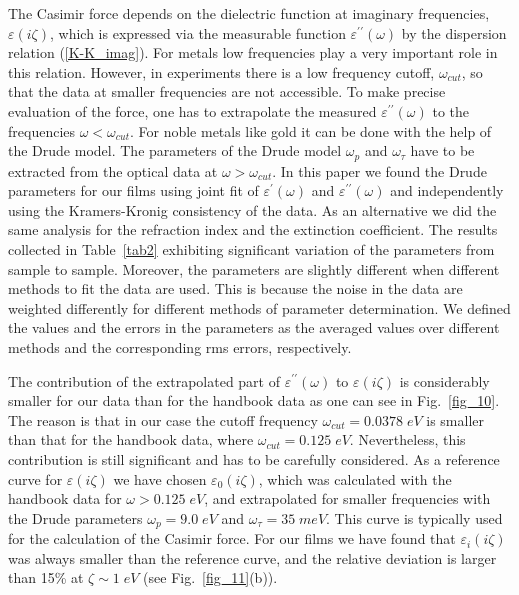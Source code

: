 \documentclass[prb]{revtex4}%
\begin{document}
The Casimir force depends on the dielectric function at imaginary
frequencies, $\varepsilon(i\zeta)$, which is expressed via the
measurable function $\varepsilon^{\prime\prime}(\omega)$ by the
dispersion relation (\ref{K-K_imag}). For metals low frequencies
play a very important role in this relation. However, in experiments
there is a low frequency cutoff, $\omega_{cut}$, so that the data at
smaller frequencies are not accessible. To make precise evaluation
of the force, one has to extrapolate the measured
$\varepsilon^{\prime\prime}(\omega)$ to the frequencies
$\omega<\omega_{cut}$. For noble metals like gold it can be done
with the help of the Drude model. The parameters of the Drude model
$\omega_p$ and $\omega_{\tau}$ have to be extracted from the optical
data at $\omega>\omega_{cut}$. In this paper we found the Drude
parameters for our films using joint fit of
$\varepsilon^{\prime}(\omega)$ and
$\varepsilon^{\prime\prime}(\omega)$ and independently using the
Kramers-Kronig consistency of the data. As an alternative we did the
same analysis for the refraction index and the extinction
coefficient. The results collected in Table~\ref{tab2} exhibiting
significant variation of the parameters from sample to sample.
Moreover, the parameters are slightly different when different
methods to fit the data are used. This is because the noise in the
data are weighted differently for different methods of parameter
determination. We defined the values and the errors in the
parameters as the averaged values over different methods and the
corresponding rms errors, respectively.

The contribution of the extrapolated part of
$\varepsilon^{\prime\prime}(\omega)$ to $\varepsilon(i\zeta)$ is
considerably smaller for our data than for the handbook data as one
can see in Fig.~\ref{fig_10}. The reason is that in our case the
cutoff frequency $\omega_{cut}=0.0378\;eV$ is smaller than that for
the handbook data, where $\omega_{cut}=0.125\;eV$. Nevertheless,
this contribution is still significant and has to be carefully
considered. As a reference curve for $\varepsilon(i\zeta)$ we have
chosen $\varepsilon_0(i\zeta)$, which was calculated with the
handbook data for $\omega>0.125\;eV$, and extrapolated for smaller
frequencies with the Drude parameters $\omega_p=9.0\;eV$ and
$\omega_{\tau}=35\;meV$. This curve is typically used for the
calculation of the Casimir force. For our films we have found that
$\varepsilon_i(i\zeta)$ was always smaller than the reference curve,
and the relative deviation is larger than 15\% at $\zeta\sim 1\;eV$
(see Fig.~\ref{fig_11}(b)).
\end{document}
